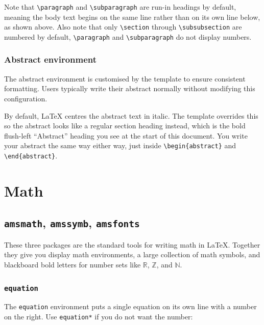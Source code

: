 		Note that \texttt{\textbackslash paragraph} and \texttt{\textbackslash subparagraph} are run-in headings by default, meaning the body text begins on the same line rather than on its own line below, as shown above. Also note that only \texttt{\textbackslash section} through \texttt{\textbackslash subsubsection} are numbered by default, \texttt{\textbackslash paragraph} and \texttt{\textbackslash subparagraph} do not display numbers.
		
		\subsubsection{Abstract environment}
		\noindent\colorbox{themecolour!15}{\parbox{\linewidth}{\small The abstract environment is customised by the template to ensure consistent formatting. Users typically write their abstract normally without modifying this configuration.}}\vspace{0.5\baselineskip}
		
		By default, \LaTeX{} centres the abstract text in italic. The template overrides this so the abstract looks like a regular section heading instead, which is the bold flush-left ``Abstract'' heading you see at the start of this document. You write your abstract the same way either way, just inside \texttt{\textbackslash begin\{abstract\}} and \texttt{\textbackslash end\{abstract\}}.

\section{Math}

	\subsection{\texttt{amsmath}, \texttt{amssymb}, \texttt{amsfonts}}
	These three packages are the standard tools for writing math in \LaTeX. Together they give you display math environments, a large collection of math symbols, and blackboard bold letters for number sets like $\mathbb{R}$, $\mathbb{Z}$, and $\mathbb{N}$.
	
		\subsubsection{\texttt{equation}}
		The \texttt{equation} environment puts a single equation on its own line with a number on the right. Use \texttt{equation*} if you do not want the number:
		

